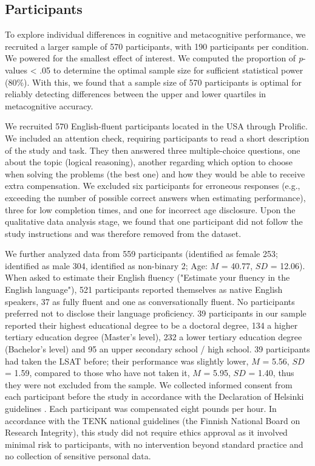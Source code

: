 \documentclass[acmlarge,review=true, anonymous=true]{acmart}
\begin{document}
\subsection{Participants}


To explore individual differences in cognitive and metacognitive performance, we recruited a larger sample of 570 participants, with 190 participants per condition.
We powered for the smallest effect of interest. We computed the proportion of \textit{p}-values < .05 to determine the optimal sample size for sufficient statistical power (80\%). With this, we found that a sample size of 570 participants is optimal for reliably detecting differences between the upper and lower quartiles in metacognitive accuracy.

We recruited 570 English-fluent participants located in the USA through Prolific. We included an attention check, requiring participants to read a short description of the study and task. They then answered three multiple-choice questions, one about the topic (logical reasoning), another regarding which option to choose when solving the problems (the best one) and how they would be able to receive extra compensation.
We excluded six participants for erroneous responses (e.g., exceeding the number of possible correct answers when estimating performance), three for low completion times, and one for incorrect age disclosure. %
Upon the qualitative data analysis stage, we found that one participant did not follow the study instructions and was therefore removed from the dataset.

We further analyzed data from 559 participants (identified as female 253; identified as male 304, identified as non-binary 2; Age: $M$ = 40.77, $SD$ = 12.06). When asked to estimate their English fluency ("Estimate your fluency in the English language"), 521 participants reported themselves as native English speakers, 37 as fully fluent and one as conversationally fluent. No participants preferred not to disclose their language proficiency. 39 participants in our sample reported their highest educational degree to be a doctoral degree, 134 a higher tertiary education degree (Master's level), 232 a lower tertiary education degree (Bachelor's level) and 95 an upper secondary school / high school. 
39 participants had taken the LSAT before; their performance was slightly lower, $M$ = 5.56, $SD$ = 1.59, compared to those who have not taken it, $M$ = 5.95, $SD$ = 1.40, thus they were not excluded from the sample. We collected informed consent from each participant before the study in accordance with the Declaration of Helsinki guidelines \cite{world2013world}. Each participant was compensated eight pounds per hour. In accordance with the TENK national guidelines (the Finnish National Board on Research Integrity), this study did not require ethics approval as it involved minimal risk to participants, with no intervention beyond standard practice and no collection of sensitive personal data. %
\end{document}
